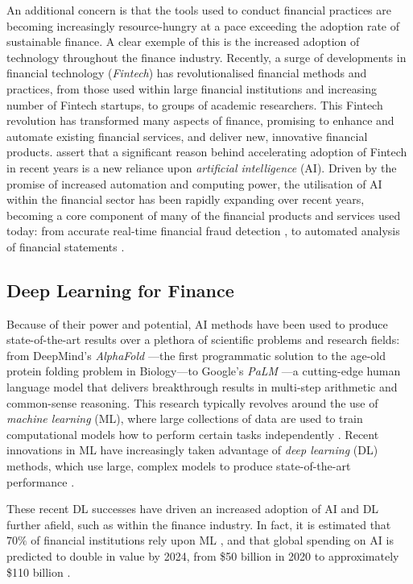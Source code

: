 \documentclass[a4paper, 11pt]{report}
\begin{document}
    An additional concern is that the tools used to conduct financial practices are becoming increasingly resource-hungry at a pace exceeding the adoption rate of sustainable finance. A clear exemple of this is the increased adoption of technology throughout the finance industry. Recently, a surge of developments in financial technology (\emph{Fintech}) has revolutionalised financial methods and practices, from those used within large financial institutions and increasing number of Fintech startups, to groups of academic researchers. This Fintech revolution has transformed many aspects of finance, promising to enhance and automate existing financial services, and deliver new, innovative financial products. \citet{palmie-2020} assert that a significant reason behind accelerating adoption of Fintech in recent years is a new reliance upon \emph{artificial intelligence} (AI). Driven by the promise of increased automation and computing power, the utilisation of AI within the financial sector has been rapidly expanding over recent years, becoming a core component of many of the financial products and services used today: from accurate real-time financial fraud detection \citep{sadgali-2019}, to automated analysis of financial statements \citep{amel-2020}.


    \subsection{Deep Learning for Finance}

    Because of their power and potential, AI methods have been used to produce state-of-the-art results over a plethora of scientific problems and research fields: from DeepMind's \emph{AlphaFold} \citep{jumper-2021}---the first programmatic solution to the age-old protein folding problem in Biology---to Google's \emph{PaLM} \citep{chowdhery-2022}---a cutting-edge human language model that delivers breakthrough results in multi-step arithmetic and common-sense reasoning. This research typically revolves around the use of \emph{machine learning} (ML), where large collections of data are used to train computational models how to perform certain tasks independently \citep{samuel-1959}. Recent innovations in ML have increasingly taken advantage of \emph{deep learning} (DL) methods, which use large, complex models to produce state-of-the-art performance \citep{witten-2017}.

    These recent DL successes have driven an increased adoption of AI and DL further afield, such as within the finance industry. In fact, it is estimated that $70\%$ of financial institutions rely upon ML \citep{gokhale-2019}, and that global spending on AI is predicted to double in value by 2024, from \$50 billion in 2020 to approximately \$110 billion \citep{oecd-2021}.
\end{document}
